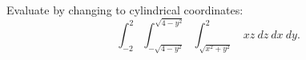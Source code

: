 \documentclass[12pt]{exam}
\begin{document}
\begin{questions}
 \newpage

 \question Evaluate by changing to cylindrical coordinates:
    \[
        \int_{-2}^{2}\int_{-\sqrt{4-y^2}}^{\sqrt{4-y^2}}\int_{\sqrt{x^2+y^2}}^2~xz~dz~dx~dy.
    \]

\end{questions}
\end{document}
